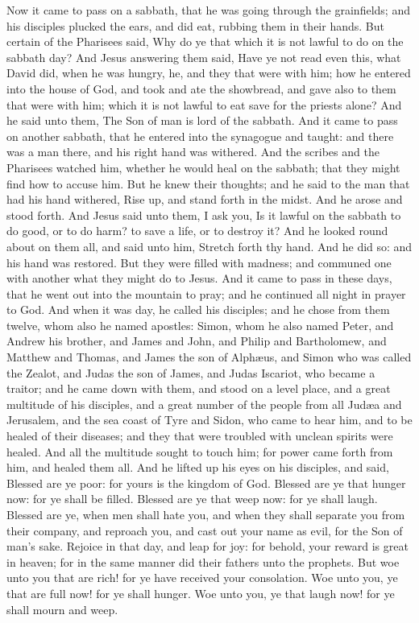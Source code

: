 Now it came to pass on a sabbath, that he was going through the grainfields; and his disciples plucked the ears, and did eat, rubbing them in their hands. But certain of the Pharisees said, Why do ye that which it is not lawful to do on the sabbath day? And Jesus answering them said, Have ye not read even this, what David did, when he was hungry, he, and they that were with him; how he entered into the house of God, and took and ate the showbread, and gave also to them that were with him; which it is not lawful to eat save for the priests alone? And he said unto them, The Son of man is lord of the sabbath.  And it came to pass on another sabbath, that he entered into the synagogue and taught: and there was a man there, and his right hand was withered. And the scribes and the Pharisees watched him, whether he would heal on the sabbath; that they might find how to accuse him. But he knew their thoughts; and he said to the man that had his hand withered, Rise up, and stand forth in the midst. And he arose and stood forth. And Jesus said unto them, I ask you, Is it lawful on the sabbath to do good, or to do harm? to save a life, or to destroy it? And he looked round about on them all, and said unto him, Stretch forth thy hand. And he did so: and his hand was restored. But they were filled with madness; and communed one with another what they might do to Jesus.  And it came to pass in these days, that he went out into the mountain to pray; and he continued all night in prayer to God. And when it was day, he called his disciples; and he chose from them twelve, whom also he named apostles: Simon, whom he also named Peter, and Andrew his brother, and James and John, and Philip and Bartholomew, and Matthew and Thomas, and James the son of Alphæus, and Simon who was called the Zealot, and Judas the son of James, and Judas Iscariot, who became a traitor; and he came down with them, and stood on a level place, and a great multitude of his disciples, and a great number of the people from all Judæa and Jerusalem, and the sea coast of Tyre and Sidon, who came to hear him, and to be healed of their diseases; and they that were troubled with unclean spirits were healed. And all the multitude sought to touch him; for power came forth from him, and healed them all.  And he lifted up his eyes on his disciples, and said, Blessed are ye poor: for yours is the kingdom of God. Blessed are ye that hunger now: for ye shall be filled. Blessed are ye that weep now: for ye shall laugh. Blessed are ye, when men shall hate you, and when they shall separate you from their company, and reproach you, and cast out your name as evil, for the Son of man’s sake. Rejoice in that day, and leap for joy: for behold, your reward is great in heaven; for in the same manner did their fathers unto the prophets. But woe unto you that are rich! for ye have received your consolation. Woe unto you, ye that are full now! for ye shall hunger. Woe unto you, ye that laugh now! for ye shall mourn and weep. 